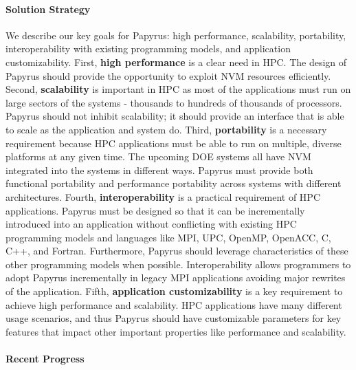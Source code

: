 \paragraph{Solution Strategy}
We describe our key goals for Papyrus: high performance, scalability, portability, interoperability with existing programming models, and application customizability. First, \textbf{high performance} is a clear need in HPC. The design of Papyrus should provide the opportunity to exploit NVM resources efficiently. Second, \textbf{scalability} is important in HPC as most of the applications must run on large sectors of the systems - thousands to hundreds of thousands of processors. Papyrus should not inhibit scalability; it should provide an interface that is able to scale as the application and system do. Third, \textbf{portability} is a necessary requirement because HPC applications must be able to run on multiple, diverse platforms at any given time. The upcoming DOE systems all have NVM integrated into the systems in different ways. Papyrus must provide both functional portability and performance portability across systems with different architectures. Fourth, \textbf{interoperability} is a practical requirement of HPC applications. Papyrus must be designed so that it can be incrementally introduced into an application without conflicting with existing HPC programming models and languages like MPI, UPC, OpenMP, OpenACC, C, C++, and Fortran. Furthermore, Papyrus should leverage characteristics of these other programming models when possible. Interoperability allows programmers to adopt Papyrus incrementally in legacy MPI applications avoiding major rewrites of the application. Fifth, \textbf{application customizability} is a key requirement to achieve high performance and scalability. HPC applications have many different usage scenarios, and thus Papyrus should have customizable parameters for key features that impact other important properties like performance and scalability.

\paragraph{Recent Progress}

